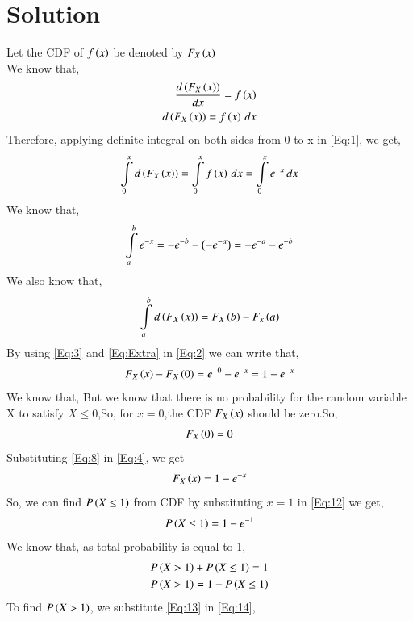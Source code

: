 \documentclass[journal,12pt,twocolumn]{IEEEtran}
\begin{document}
\section{Solution}
Let the CDF of $f\left(x\right)$ be denoted by $F_X\left(x\right)$ \\
We know that,
\begin{align}
\frac{d\left(F_X\left(x\right)\right)}{dx} = f\left(x\right) \notag \\
d\left(F_X\left(x\right)\right) = f\left(x\right) \,dx \label{Eq:1}
\end{align}
Therefore, applying definite integral on both sides from 0 to x in \eqref{Eq:1}, we get,
\begin{align}
\int\limits_{0}^{x} d\left(F_X\left(x\right)\right) = \int\limits_{0}^{x} f\left(x\right) \,dx = \int\limits_{0}^{x} e^{-x} \,dx \label{Eq:2}
\end{align}
We know that,
\begin{align}
\int\limits_{a}^{b} e^{-x} = -e^{-b}-\left(-e^{-a}\right) = -e^{-a}-e^{-b}  \label{Eq:3}
\end{align}
We also know that,
\begin{align}
\int\limits_{a}^{b} d\left(F_X\left(x\right)\right) = F_X\left(b\right) - F_x\left(a\right) \label{Eq:Extra}
\end{align}
By using \eqref{Eq:3} and \eqref{Eq:Extra} in \eqref{Eq:2} we can write that,
\begin{align}
F_X\left(x\right) - F_X\left(0\right) = e^{-0} - e^{-x} = 1 - e^{-x}   \label{Eq:4}
\end{align}
We know that,
But we know that there is no probability for the random variable X to satisfy $X \leq 0$,So, for $x = 0$,the CDF $F_X\left(x\right)$ should be zero.So,
\begin{align}
F_X\left(0\right) = 0 \label{Eq:8}
\end{align}
Substituting \eqref{Eq:8} in \eqref{Eq:4}, we get
\begin{align}
F_X\left(x\right) = 1 - e^{-x} \label{Eq:12}
\end{align}
So, we can find $P\left(X \leq 1\right)$ from CDF by substituting $x = 1$ in \eqref{Eq:12} we get,
\begin{align}
P\left(X\leq 1\right) = 1-e^{-1} \label{Eq:13}
\end{align}
We know that, as total probability is equal to 1,
\begin{align}
P\left(X>1\right)+P\left(X\leq1\right)=1 \notag \\
P\left(X>1\right)=1-P\left(X\leq 1\right)\label{Eq:14}
\end{align}
To find $P\left(X>1\right)$, we substitute \eqref{Eq:13} in \eqref{Eq:14},
\end{document}

